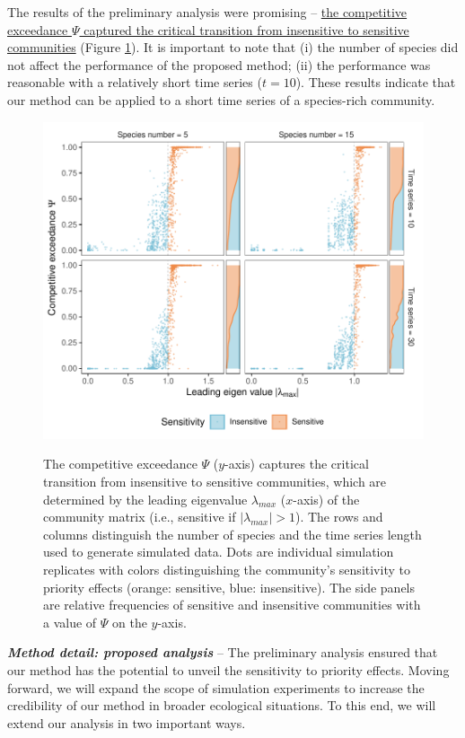 \documentclass[12pt, class=article, crop=false]{standalone}
\begin{document}
The results of the preliminary analysis were promising -- \ul{the competitive exceedance $\Psi$ captured the critical transition from insensitive to sensitive communities} (Figure \ref{fig:box}). It is important to note that (i) the number of species did not affect the performance of the proposed method; (ii) the performance was reasonable with a relatively short time series ($t = 10$).
These results indicate that our method can be applied to a short time series of a species-rich community. 

\begin{figure}
    \caption{The competitive exceedance $\Psi$ ($y$-axis) captures the critical transition from insensitive to sensitive communities, which are determined by the leading eigenvalue $\lambda_{max}$ ($x$-axis) of the community matrix (i.e., sensitive if $|\lambda_{max}| > 1$).
    The rows and columns distinguish the number of species and the time series length used to generate simulated data.
    Dots are individual simulation replicates with colors distinguishing the community's sensitivity to priority effects (orange: sensitive, blue: insensitive).
    The side panels are relative frequencies of sensitive and insensitive communities with a value of $\Psi$ on the $y$-axis.}
    \includegraphics[scale=0.7]{output/figure_eigen_scatter.pdf}
    \label{fig:box}
\end{figure}

\textbf{\textit{Method detail: proposed analysis}} -- 
The preliminary analysis ensured that our method has the potential to unveil the sensitivity to priority effects.
Moving forward, we will expand the scope of simulation experiments to increase the credibility of our method in broader ecological situations.
To this end, we will extend our analysis in two important ways.
\end{document}
